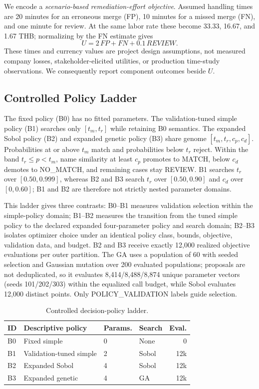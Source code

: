 \documentclass[conference]{IEEEtran}
\begin{document}
We encode a \emph{scenario-based remediation-effort objective}. Assumed handling times are 20 minutes for an erroneous merge (FP), 10 minutes for a missed merge (FN), and one minute for review. At the same labor rate these become 33.33, 16.67, and 1.67 THB; normalizing by the FN estimate gives
\begin{equation}
U=2\,FP+FN+0.1\,REVIEW .
\end{equation}
These times and currency values are project design assumptions, not measured company losses, stakeholder-elicited utilities, or production time-study observations. We consequently report component outcomes beside $U$.

\subsection{Controlled Policy Ladder}
The fixed policy (B0) has no fitted parameters. The validation-tuned simple policy (B1) searches only $[t_m,t_r]$ while retaining B0 semantics. The expanded Sobol policy (B2) and expanded genetic policy (B3) share genome $[t_m,t_r,c_p,c_d]$. Probabilities at or above $t_m$ match and probabilities below $t_r$ reject. Within the band $t_r \le p < t_m$, name similarity at least $c_p$ promotes to MATCH, below $c_d$ demotes to NO\_MATCH, and remaining cases stay REVIEW. B1 searches $t_r$ over $[0.50,0.999]$, whereas B2 and B3 search $t_r$ over $[0.50,0.90]$ and $c_d$ over $[0,0.60]$; B1 and B2 are therefore not strictly nested parameter domains.

This ladder gives three contrasts: B0--B1 measures validation selection within the simple-policy domain; B1--B2 measures the transition from the tuned simple policy to the declared expanded four-parameter policy and search domain; B2--B3 isolates optimizer choice under an identical policy class, bounds, objective, validation data, and budget. B2 and B3 receive exactly 12,000 realized objective evaluations per outer partition. The GA uses a population of 60 with seeded selection and Gaussian mutation over 200 evaluated populations; proposals are not deduplicated, so it evaluates 8,414/8,488/8,874 unique parameter vectors (seeds 101/202/303) within the equalized call budget, while Sobol evaluates 12,000 distinct points. Only POLICY\_VALIDATION labels guide selection.

\begin{table}[t]
\caption{Controlled decision-policy ladder.}
\label{tab:policies}
\centering
\begin{tabular}{llllr}
\toprule
ID & Descriptive policy & Params. & Search & Eval.\\
\midrule
B0 & Fixed simple & 0 & None & 0\\
B1 & Validation-tuned simple & 2 & Sobol & 12k\\
B2 & Expanded Sobol & 4 & Sobol & 12k\\
B3 & Expanded genetic & 4 & GA & 12k\\
\bottomrule
\end{tabular}
\end{table}
\end{document}
